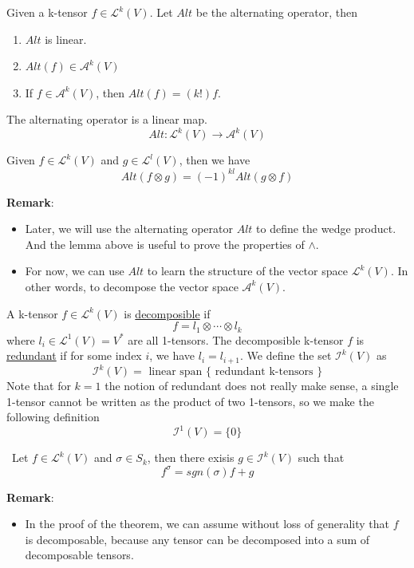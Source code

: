 \begin{theorem}
    Given a k-tensor $f\in \mathcal{L}^k(V)$. Let $Alt$ be the alternating operator, then 
    \begin{enumerate}
        \item $Alt$ is linear.
        \item $Alt(f)\in \mathcal{A}^k(V)$
        \item If $f\in \mathcal{A}^k(V)$, then $Alt(f)=(k!)f$.
    \end{enumerate}
\end{theorem}

\begin{corollary}
    The alternating operator is a linear map. $$Alt:\mathcal{L}^k(V)\longrightarrow\mathcal{A}^k(V)$$
\end{corollary}

\begin{lemma}
    Given $f\in\mathcal{L}^k(V)$ and $g\in\mathcal{L}^l(V)$, then we have $$Alt(f\otimes g)=(-1)^{kl}Alt(g\otimes f)$$
\end{lemma}

\noindent\textbf{Remark}:
\begin{itemize}
    \item Later, we will use the alternating operator $Alt$ to define the wedge product. And the lemma above is useful to prove the properties of $\wedge$.
    \item For now, we can use $Alt$ to learn the structure of the vector space $\mathcal{L}^k(V)$. In other words, to decompose the vector space $\mathcal{A}^k(V)$.
\end{itemize}

\begin{definition}
    A k-tensor $f\in\mathcal{L}^k(V)$ is \underline{decomposible} if $$f=l_1\otimes \cdots \otimes l_k$$
    where $l_i\in \mathcal{L}^1(V)=V^*$ are all 1-tensors. The decomposible k-tensor $f$ is \underline{redundant} if for some index $i$, we have $l_i=l_{i+1}$. We define the set $\mathcal{I}^k(V)$ as 
    $$\mathcal{I}^k(V)=\text{ linear span }\{\text{ redundant k-tensors }\} $$
    Note that for $k=1$ the notion of redundant does not really make sense, a single 1-tensor cannot be written as the product of two 1-tensors, so we make the following definition $$\mathcal{I}^1(V)=\{0\}$$
\end{definition}

\begin{lemma}\
    Let $f\in\mathcal{L}^k(V)$ and $\sigma\in S_k$, then there exisis $g\in \mathcal{I}^k(V)$ such that $$f^{\sigma}=sgn(\sigma)f+g$$
\end{lemma}
\noindent\textbf{Remark}:
\begin{itemize}
    \item In the proof of the theorem, we can assume without loss of generality that $f$ is decomposable, because any tensor can be decomposed into a sum of decomposable tensors.
\end{itemize}


